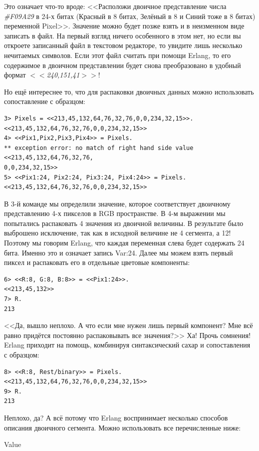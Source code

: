 \documentclass[a4paper,12pt]{report}
\newcommand{\ops}{\colorbox{lgreen}}
\begin{document}
Это означает что\--то вроде: <<Расположи двоичное представление числа \emph{\#F09A29} в 24\--х битах (Красный в 8 битах, Зелёный в 8 и Синий тоже в 8 битах) переменной Pixel>>. Значение можно будет позже взять и в неизменном виде записать в файл. На первый взгляд ничего особенного в этом нет, но если вы откроете записанный файл в текстовом редакторе, то увидите лишь несколько нечитаемых символов. Если этот файл считать при помощи Erlang, то его содержимое в двоичном представлении будет снова преобразовано в удобный формат \emph{$<<$240,151,41$>>$}!

Но ещё интереснее то, что для распаковки двоичных данных можно использовать сопоставление с образцом:
\begin{lstlisting}[style=repl]
3> Pixels = <<213,45,132,64,76,32,76,0,0,234,32,15>>.
<<213,45,132,64,76,32,76,0,0,234,32,15>>
4> <<Pix1,Pix2,Pix3,Pix4>> = Pixels.
** exception error: no match of right hand side value <<213,45,132,64,76,32,76,
0,0,234,32,15>>
5> <<Pix1:24, Pix2:24, Pix3:24, Pix4:24>> = Pixels.
<<213,45,132,64,76,32,76,0,0,234,32,15>>
\end{lstlisting}

В 3\--й команде мы определили значение, которое соответствует двоичному представлению 4\--х пикселов в RGB пространстве. В 4\--м выражении мы попытались распаковать 4 значения из двоичной величины. В результате было выброшено исключение, так как в исходной величине не 4 сегмента, а 12! Поэтому мы говорим Erlang, что каждая переменная слева будет содержать 24 бита. Именно это и означает запись \ops{Var:24}. Далее мы можем взять первый пиксел и распаковать его в отдельные цветовые компоненты:
\begin{lstlisting}[style=repl]
6> <<R:8, G:8, B:8>> = <<Pix1:24>>.
<<213,45,132>>
7> R.
213
\end{lstlisting}

<<Да, вышло неплохо. А что если мне нужен лишь первый компонент? Мне всё равно придётся постоянно распаковывать все значения?>> Ха! Прочь сомнения! Erlang приходит на помощь, комбинируя синтаксический сахар и сопоставления с образцом:
\begin{lstlisting}[style=repl]
8> <<R:8, Rest/binary>> = Pixels.
<<213,45,132,64,76,32,76,0,0,234,32,15>>
9> R.
213
\end{lstlisting}

Неплохо, да? А всё потому что Erlang воспринимает несколько способов описания двоичного сегмента. Можно использовать все перечисленные ниже:

Value
\end{document}
